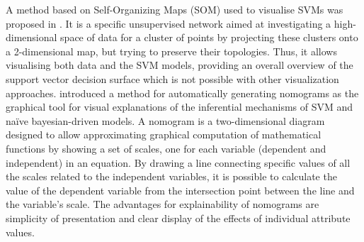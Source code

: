 \documentclass[final,1p,times]{elsarticle}
\begin{document}
A method based on Self-Organizing Maps (SOM) used to visualise SVMs was proposed in \cite{hamel2006visualization}. 
It is a specific unsupervised network aimed at investigating a high-dimensional space of data for a cluster of points by projecting these clusters onto a 2-dimensional map, but trying to preserve their topologies.
Thus, it allows visualising both data and the SVM models, providing an overall overview of the support vector decision surface which is not possible with other visualization approaches.  
\cite{jakulin2005nomograms,cho2008nonlinear,movzina2004nomograms} introduced a method for automatically generating nomograms as the graphical tool for visual explanations of the inferential mechanisms of SVM and na\"{i}ve bayesian-driven models. A nomogram is a two-dimensional diagram designed to allow approximating graphical computation of mathematical functions by showing a set of scales, one for each variable (dependent and independent) in an equation. By drawing a line connecting specific values of all the scales related to the independent variables, it is possible to calculate the value of the dependent variable from the intersection point between the line and the variable's scale. The advantages for explainability of nomograms are simplicity of presentation and clear display of the effects of individual attribute values.
\end{document}
